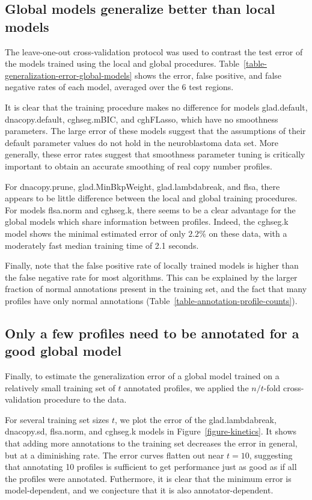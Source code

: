 \documentclass{bioinfo}
\begin{document}
\subsection{Global models generalize better than local models}
The leave-one-out cross-validation protocol was used to contrast the
test error of the models trained using the local and global 
procedures. Table~\ref{table-generalization-error-global-models} shows
the error, false positive, and false negative rates of each
model, averaged over the 6 test regions.

It is clear that the training procedure makes no difference for models
glad.default, dnacopy.default, cghseg.mBIC, and cghFLasso, which have
no smoothness parameters. The large error of these models suggest that
the assumptions of their default parameter values do not hold in the
neuroblastoma data set. More generally, these error rates suggest that
smoothness parameter tuning is critically important to obtain an
accurate smoothing of real copy number profiles.

For dnacopy.prune, glad.MinBkpWeight, glad.lambdabreak, and flsa,
there appears to be little difference between the local and global
training procedures. For models flsa.norm and cghseg.k, there seems to
be a clear advantage for the global models which share information
between profiles. Indeed, the cghseg.k model shows the minimal
estimated error of only $ 2.2\%$ on these data, with a moderately fast
median training time of 2.1 seconds.

Finally, note that the false positive rate of locally trained models
is higher than the false negative rate for most algorithms. This can be
explained by the larger fraction of normal annotations present in the
training set, and the fact that many profiles have only normal
annotations (Table~\ref{table-annotation-profile-counts}).

\subsection{Only a few profiles need to be annotated for a good global
  model}

Finally, to estimate the generalization error of a global model
trained on a relatively small training set of $t$ annotated profiles,
we applied the $n/t$-fold cross-validation procedure to the data.

For several training set sizes $t$, we plot the error of the
glad.lambdabreak, dnacopy.sd, flsa.norm, and cghseg.k models in
Figure~\ref{figure-kinetics}. It shows that adding more annotations to
the training set decreases the error in general, but at a diminishing
rate. The error curves flatten out near $t=10$, suggesting that
annotating 10 profiles is sufficient to get performance just as good
as if all the profiles were annotated. Futhermore, it is clear that
the minimum error is model-dependent, and we conjecture that it is
also annotator-dependent.
\end{document}
